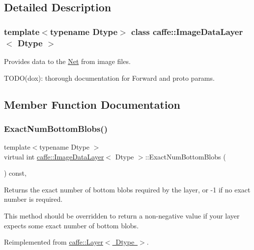 \subsection{Detailed Description}
\subsubsection*{template$<$typename Dtype$>$\newline
class caffe\+::\+Image\+Data\+Layer$<$ Dtype $>$}

Provides data to the \mbox{\hyperlink{classcaffe_1_1_net}{Net}} from image files. 

T\+O\+D\+O(dox)\+: thorough documentation for Forward and proto params. 

\subsection{Member Function Documentation}
\mbox{\label{classcaffe_1_1_image_data_layer_a6776c86faf14e35ae7be9848c7012aa5}} 
\subsubsection{\texorpdfstring{Exact\+Num\+Bottom\+Blobs()}{ExactNumBottomBlobs()}\hspace{0.1cm}{\footnotesize\ttfamily [1/2]}}
{\footnotesize\ttfamily template$<$typename Dtype $>$ \\
virtual int \mbox{\hyperlink{classcaffe_1_1_image_data_layer}{caffe\+::\+Image\+Data\+Layer}}$<$ Dtype $>$\+::Exact\+Num\+Bottom\+Blobs (\begin{DoxyParamCaption}{ }\end{DoxyParamCaption}) const\hspace{0.3cm}{\ttfamily [inline]}, {\ttfamily [virtual]}}



Returns the exact number of bottom blobs required by the layer, or -\/1 if no exact number is required. 

This method should be overridden to return a non-\/negative value if your layer expects some exact number of bottom blobs. 

Reimplemented from \mbox{\hyperlink{classcaffe_1_1_layer_a8e5ee0494d85f5f55fc4396537cbc60f}{caffe\+::\+Layer$<$ Dtype $>$}}.

